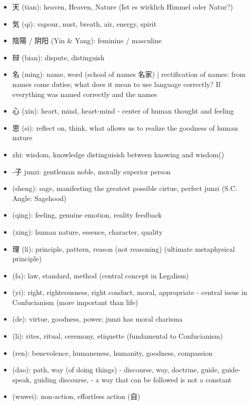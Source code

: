 \documentclass[emulatestandardclasses]{scrartcl}
\begin{document}
\begin{itemize}
  \item 天 (tian): heaven, Heaven, Nature (Ist es wirklich Himmel oder Natur?)
  \item 気 (qi): vapour, nust, breath, air, energy, spirit
  \item 陰陽 / 阴阳 (Yin \& Yang): feminine / masculine
  \item 辩 (bian): dispute, distinguish
  \item 名 (ming): name, word (school of names 名家) | rectification of names: from names come duties; what does it mean to use language correctly? If everything was named correctly and the names
  \item 心 (xin): heart, mind, heart-mind - center of human thought and feeling
  \item 思 (si): reflect on, think, what allows us to realize the goodness of human nature
  \item zhi: wisdom, knowledge distinguisish between knowing and wisdom()
  \item -子 junzi: gentleman noble, morally superior person
  \item (sheng): sage, manifesting the greatest possible cirtue, perfect junzi (S.C. Angle: Sagehood)
  \item (qing): feeling, genuine emotion, reality feedback
  \item (xing): human nature, essence, character, quality
  \item 理 (li): principle, pattern, reason (not reasoning) (ultimate metaphysical principle)
  \item (fa): law, standard, method (central concept in Legalism)
  \item (yi): right, righteousness, right conduct, moral, appropriate - central issue in Confucianism (more important than life)
  \item (de): virtue, goodness, power; junzi has moral charisma
  \item (li): rites, ritual, ceremony, etiquette (fundamental to Confucianism)
  \item (ren): benevolence, humaneness, humanity, goodness, compassion
  \item (dao): path, way (of doing things) - discourse, way, doctrine, guide, guide-speak, guiding discourse, - a way that can be followed is not a constant 
  \item (wuwei): non-action, effortless action (自)
\end{itemize}
\end{document}
